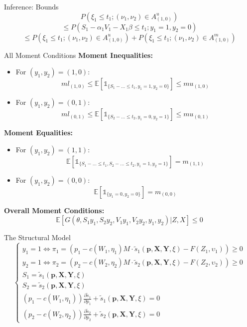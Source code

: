 \documentclass{beamer}
\begin{document}
\begin{frame}{Inference: Bounds}
    \small
    \[
    P(\xi_1 \leq t_1; (\nu_1,\nu_2)\in A^{u}_{(1,0)})
    \]
    \[
    \leq P(S_1 - \alpha_1 V_1 - X_1 \beta \leq t_1; y_1=1,y_2=0)
    \]
    \[
    \leq P(\xi_1 \leq t_1; (\nu_1,\nu_2)\in A^{u}_{(1,0)}) + P(\xi_1 \leq t_1; (\nu_1,\nu_2)\in A^{m}_{(1,0)})
    \]
    \vspace{0.2cm}
\end{frame}

\begin{frame}{All Moment Conditions}
    \small
    \textbf{Moment Inequalities:}
    \begin{itemize}
        \item For $(y_1, y_2)=(1,0)$:
        \[
        ml_{(1,0)}\leq \mathbb{E}[ \mathbb{1}_{\{S_1-\dots\leq t_1, y_1=1, y_2=0\}} ] \leq mu_{(1,0)}
        \]
        \item For $(y_1, y_2)=(0,1)$:
        \[
        ml_{(0,1)}\leq \mathbb{E}[ \mathbb{1}_{\{S_2-\dots\leq t_2, y_1=0, y_2=1\}} ] \leq mu_{(0,1)}
        \]
    \end{itemize}
    \vspace{0.2cm}
    \textbf{Moment Equalities:}
    \begin{itemize}
        \item For $(y_1, y_2)=(1,1)$:
        \[
        \mathbb{E}[ \mathbb{1}_{\{S_1-\dots\leq t_1, S_2-\dots\leq t_2, y_1=1, y_2=1\}} ] = m_{(1,1)}
        \]
        \item For $(y_1, y_2)=(0,0)$:
        \[
        \mathbb{E}[ \mathbb{1}_{\{y_1=0, y_2=0\}} ] = m_{(0,0)}
        \]
    \end{itemize}

    \textbf{Overall Moment Conditions:}
    \[
    \mathbb{E}[G(\theta, S_1y_1, S_2y_2, V_1y_1, V_2y_2, y_1, y_2)|Z, X] \leq 0
    \]
\end{frame}

\begin{frame}{The Structural Model}
    \begin{equation}
        \begin{cases}
        y_1=1 \iff \pi_1=\left(p_1-c(W_1, \eta_1) M \cdot \tilde{s}_1(\textbf{p},\textbf{X}, \textbf{Y}, \xi)- F(Z_1, \upsilon_1)\right) \geq 0 \\
        y_2=1 \iff \pi_2=\left(p_2-c(W_2, \eta_2) M \cdot \tilde{s}_2(\textbf{p},\textbf{X}, \textbf{Y}, \xi)- F(Z_2, \upsilon_2)\right) \geq 0 \\
        S_1= \tilde{s}_1(\textbf{p},\textbf{X}, \textbf{Y}, \xi) \\
        S_2= \tilde{s}_2(\textbf{p},\textbf{X}, \textbf{Y}, \xi) \\
        \left(p_1-c(W_1, \eta_1)\right) \frac{\partial \tilde{s}_1}{\partial p_1}+\tilde{s}_1(\textbf{p},\textbf{X}, \textbf{Y}, \xi) = 0 \\
        \left(p_2-c(W_2, \eta_2)\right) \frac{\partial \tilde{s}_2}{\partial p_2}+\tilde{s}_2(\textbf{p},\textbf{X}, \textbf{Y}, \xi)=0
        \end{cases}
    \end{equation}
\end{frame}
\end{document}
